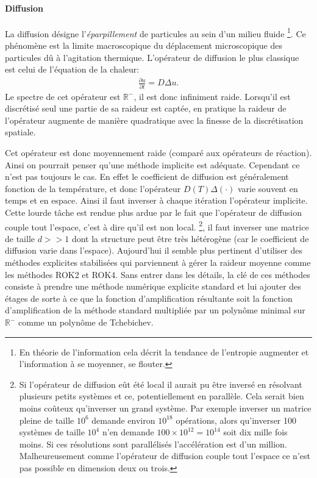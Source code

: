 \paragraph{Diffusion}
    La diffusion désigne l'\textit{éparpillement} de particules au sein d'un milieu fluide
    \footnote{En théorie de l'information cela décrit la tendance de l'entropie augmenter et l'information à se moyenner, se flouter.}.
    Ce phénomène est la limite macroscopique du déplacement microscopique
    des particules dû à l'agitation thermique. L'opérateur de diffusion le plus classique est celui de l'équation de la chaleur:
    \begin{align} \frac{\partial u}{\partial t} = D \Delta u.\end{align}
    Le spectre de cet opérateur est $\mathbb R^-$, il est donc infiniment raide. Lorsqu'il est discrétisé seul une partie de sa raideur est captée,
    en pratique la raideur de l'opérateur augmente de manière quadratique avec la finesse de la discrétisation spatiale.\par
    Cet opérateur est donc moyennement raide (comparé aux opérateurs de réaction). Ainsi on pourrait penser qu'une méthode implicite est adéquate. Cependant ce n'est pas toujours le cas.
    En effet le coefficient de diffusion est généralement fonction de la température, et donc l’opérateur $D(T) \Delta(\cdot)$ varie souvent en temps et en espace. 
    Ainsi il faut inverser à chaque itération l'opérateur implicite. Cette lourde tâche est rendue plus ardue par le fait que l'opérateur de diffusion couple tout l'espace, c'est à dire qu'il est non local.
    \footnote{Si l'opérateur de diffusion eût été local il aurait pu être inversé en résolvant plusieurs petits systèmes et ce, potentiellement en parallèle.
    Cela serait bien moins coûteux qu'inverser un grand système. 
    Par exemple inverser un matrice pleine de taille $10^6$ demande environ $10^{18}$ opérations, alors qu'inverser 100 systèmes de taille $10^4$
    n'en demande $100 \times 10^{12} = 10^{14}$ soit dix mille fois moins. Si ces résolutions sont parallélisés l'accélération est d'un million. Malheureusement comme
    l'opérateur de diffusion couple tout l'espace ce n'est pas possible en dimension deux ou trois.},
    il faut inverser une matrice de taille $d >> 1$ dont la structure
    peut être très hétérogène (car le coefficient de diffusion varie dans l'espace). Aujourd'hui il semble plus pertinent
    d'utiliser des méthodes explicites stabilisées qui parviennent à gérer la raideur moyenne comme les méthodes 
    ROK2 et ROK4\cite{abdulle2002fourth}. Sans entrer dans les détails, la clé de ces méthodes consiste à prendre une méthode numérique explicite standard et lui ajouter des étages 
    de sorte à ce que la fonction d'amplification résultante soit la fonction d'amplification de la méthode standard multipliée par un polynôme minimal sur $\mathbb R^-$
    comme un polynôme de Tchebichev.

